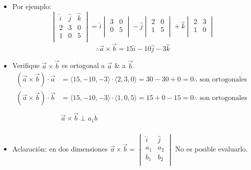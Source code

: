 \documentclass{article}
\begin{document}
\begin{itemize}
    \item Por ejemplo:
        \begin{equation*}
            \begin{vmatrix}
                \hat{i} & \hat{j} & \hat{k} \\ 
                2 & 3 & 0 \\ 
                1 & 0 & 5 \\ 
            \end{vmatrix} = \hat{i}\begin{vmatrix}
                3 & 0 \\ 
                0 & 5 \\ 
            \end{vmatrix} - \hat{j}\begin{vmatrix}
                2 & 0 \\ 
                1 & 5 \\ 
            \end{vmatrix} + \hat{k} \begin{vmatrix}
                2 & 3 \\ 
                1 & 0 \\ 
            \end{vmatrix}
        \end{equation*}
        \[
          \therefore \vec{a}\times \vec{b} = 15\hat{i}-10\hat{j}-3\hat{k}
        \]
    
    \item Verifique $\vec{a}\times \vec{b}$ es ortogonal a $\vec{a}$ \& a $\vec{b}$.
        \begin{align*}
            (\vec{a}\times \vec{b})\cdot \vec{a} & = \langle 15,-10,-3 \rangle \cdot \langle 2,3,0 \rangle = 30-30+0 = 0 \therefore \text{  son ortogonales  } \\ 
            (\vec{a}\times \vec{b}) \cdot \vec{b} & = \langle 15, -10,-3\rangle \cdot \langle 1,0,5 \rangle = 15+0-15 = 0 \therefore \text{  son ortogonales  } \\ 
            \\ 
            & \vec{a}\times \vec{b} \perp a_1b \\ 
        \end{align*}
    
    \item Aclaración: en dos dimensiones $\vec{a}\times \vec{b} = \begin{vmatrix}
        \hat{i} & \hat{j} \\ 
        a_1 & a_2 \\ 
        b_1 & b_2 \\ 
    \end{vmatrix} $  No es posible evaluarlo.
    

\end{itemize}
\end{document}

